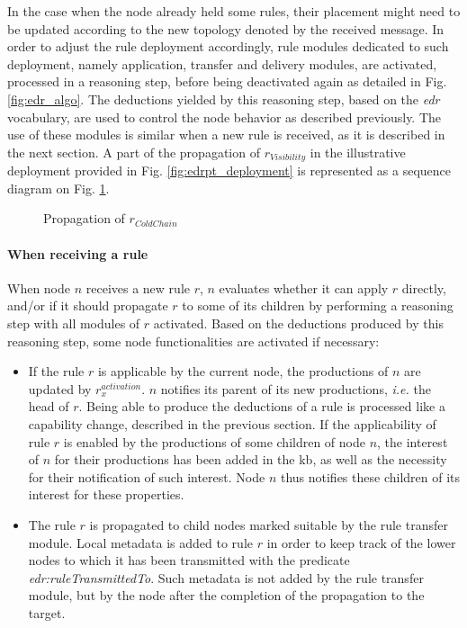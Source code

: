 \documentclass{iosart2c}
\begin{document}
In the case when the node already held some rules, their placement might need to be updated according to the new topology denoted by the received message.
In order to adjust the rule deployment accordingly, rule modules dedicated to such deployment, namely application, transfer and delivery modules, are activated, processed in a reasoning step, before being deactivated again as detailed in Fig. \ref{fig:edr_algo}.
The deductions yielded by this reasoning step, based on the \textit{edr} vocabulary, are used to control the node behavior as described previously.
The use of these modules is similar when a new rule is received, as it is described in the next section.
A part of the propagation of $r_{Visibility}$ in the illustrative deployment provided in Fig. \ref{fig:edrpt_deployment} is represented as a sequence diagram on Fig. \ref{fig:seq_temperaturegap}.

\begin{figure}
	\centering
	\caption{Propagation of $r_{ColdChain}$}
	\label{fig:seq_temperaturegap}
	\scalebox{0.8}{
		
	}
\end{figure}

\paragraph{When receiving a rule}

When node $n$ receives a new rule $r$, $n$ evaluates whether it can apply $r$ directly, and/or if it should propagate $r$ to some of its children by performing a reasoning step with all modules of $r$ activated. 
Based on the deductions produced by this reasoning step, some node functionalities are activated if necessary: 
\begin{itemize}
	\item If the rule $r$ is applicable by the current node, the productions of $n$ are updated by $r_{x}^{activation}$.
	$n$ notifies its parent of its new productions, \textit{i.e.} the head of $r$.
	Being able to produce the deductions of a rule is processed like a capability change, described in the previous section.
	If the applicability of rule $r$ is enabled by the productions of some children of node $n$, the interest of $n$ for their productions has been added in the \gls{kb}, as well as the necessity for their notification of such interest.
	Node $n$ thus notifies these children of its interest for these properties.
	\item The rule $r$ is propagated to child nodes marked suitable by the rule transfer module. 
	Local metadata is added to rule $r$ in order to keep track of the lower nodes to which it has been transmitted with the predicate \textit{edr:rule\-Transmitted\-To}. 
	Such metadata is not added by the rule transfer module, but by the node after the completion of the propagation to the target.
\end{itemize}
\end{document}
